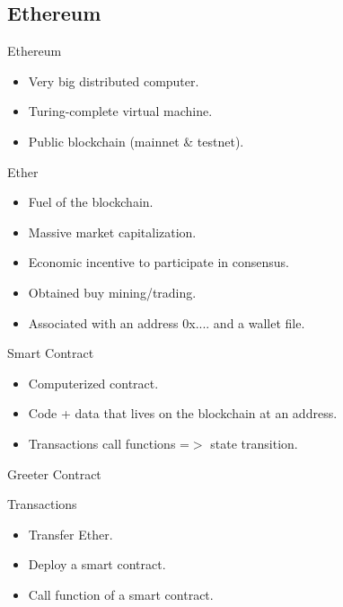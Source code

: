 \documentclass{beamer}
\begin{document}
\subsection{Ethereum}

\begin{frame}{Ethereum}
	\begin{itemize}
		\item {
			Very big distributed computer.
		}
		\item {
			Turing-complete virtual machine.
		}
		\item {
			Public blockchain (mainnet \& testnet).
		}
	\end{itemize}
\end{frame}

\begin{frame}{Ether}
	\begin{itemize}
		\item {
			Fuel of the blockchain.
		}
		\item {
			Massive market capitalization.
		}
		\item {
			Economic incentive to participate in consensus.
		}
		\item {
			Obtained buy mining/trading.
		}
		\item {
			Associated with an address 0x.... and a wallet file.
		}
	\end{itemize}
\end{frame}

\begin{frame}{Smart Contract}
	\begin{itemize}
		\item {
			Computerized contract.
		}
		\item {
			Code + data that lives on the blockchain at an address.
		}
		\item {
			Transactions call functions =$>$ state transition.
		}
	\end{itemize}
\end{frame}

\begin{frame}{Greeter Contract}
	
\end{frame}

\begin{frame}{Transactions}
	\begin{itemize}
		\item {
			Transfer Ether.
		}
		\item {
			Deploy a smart contract.
		}
		\item {
			Call function of a smart contract.
		}
	\end{itemize}
\end{frame}
\end{document}
